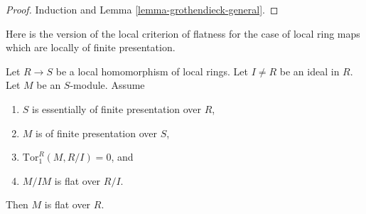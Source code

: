 \begin{proof}
Induction and Lemma \ref{lemma-grothendieck-general}.
\end{proof}

\noindent
Here is the version of the local criterion of flatness for the case
of local ring maps which are locally of finite presentation.

\begin{lemma}
\label{lemma-variant-local-criterion-flatness-general}
Let $R \to S$ be a local homomorphism of local rings.
Let $I \not = R$ be an ideal in $R$. Let $M$ be an $S$-module. Assume
\begin{enumerate}
\item $S$ is essentially of finite presentation over $R$,
\item $M$ is of finite presentation over $S$,
\item $\text{Tor}_1^R(M, R/I) = 0$, and
\item $M/IM$ is flat over $R/I$.
\end{enumerate}
Then $M$ is flat over $R$.
\end{lemma}

